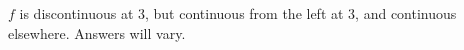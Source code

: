 {$f$ is discontinuous at 3, but continuous from the left at 3, and continuous elsewhere.}
{Answers will vary.}
